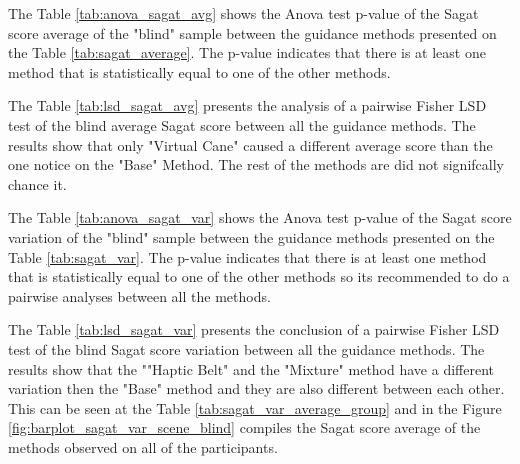 

The Table \ref{tab:anova_sagat_avg} shows the Anova test p-value of the Sagat score average of the "blind" sample between the guidance methods presented on the Table \ref{tab:sagat_average}. The p-value indicates that there is at least one method that is statistically equal to one of the other methods.



The Table \ref{tab:lsd_sagat_avg} presents the analysis of a pairwise Fisher LSD test of the blind average Sagat score  between all the guidance methods. The results show that only "Virtual Cane" caused a different average score than the one notice on the "Base" Method. The rest of the methods are did not signifcally chance it.



The Table \ref{tab:anova_sagat_var} shows the Anova test p-value of the Sagat score variation of the "blind" sample between the guidance methods presented on the Table \ref{tab:sagat_var}. The p-value indicates that there is at least one method that is statistically equal to one of the other methods so its recommended to do a pairwise analyses between all the methods.





The Table \ref{tab:lsd_sagat_var} presents the conclusion of a pairwise Fisher LSD test of the blind Sagat score variation between all the guidance methods. The results show that the ""Haptic Belt" and the "Mixture" method have a different variation then the "Base" method and they are also different between each other. This can be seen at the Table \ref{tab:sagat_var_average_group} and in the Figure \ref{fig:barplot_sagat_var_scene_blind} compiles the Sagat score average of the methods observed on all of the participants.





